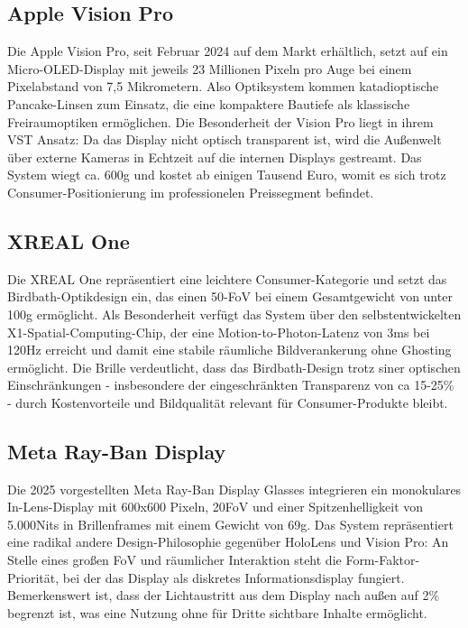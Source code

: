 \subsection{Apple Vision Pro}
\label{subsec:AppleVision}
Die Apple Vision Pro, seit Februar 2024 auf dem Markt erhältlich, setzt auf ein Micro-OLED-Display mit jeweils 23 Millionen Pixeln pro Auge bei einem Pixelabstand von 7,5 Mikrometern. Also Optiksystem kommen katadioptische Pancake-Linsen zum Einsatz, die eine kompaktere Bautiefe als klassische Freiraumoptiken ermöglichen. Die Besonderheit der Vision Pro liegt in ihrem \ac{VST} Ansatz: Da das Display nicht optisch transparent ist, wird die Außenwelt über externe Kameras in Echtzeit auf die internen Displays gestreamt. Das System wiegt ca. 600g und kostet ab einigen Tausend Euro, womit es sich trotz Consumer-Positionierung im professionelen Preissegment befindet. \autocite[vgl. ]{AppleVisionPro}

\subsection{XREAL One}
\label{subsec:Xreal}
Die XREAL One repräsentiert eine leichtere Consumer-Kategorie und setzt das Birdbath-Optikdesign ein, das einen 50\textdegree-\ac{FoV} bei einem Gesamtgewicht von unter 100g ermöglicht. Als Besonderheit verfügt das System über den selbstentwickelten X1-Spatial-Computing-Chip, der eine Motion-to-Photon-Latenz von 3ms bei 120Hz erreicht und damit eine stabile räumliche Bildverankerung ohne Ghosting ermöglicht. Die Brille verdeutlicht, dass das Birdbath-Design trotz siner optischen Einschränkungen - insbesondere der eingeschränkten Transparenz von ca 15-25\% - durch Kostenvorteile und Bildqualität relevant für Consumer-Produkte bleibt. \autocite[vgl. ]{XREALBuildingAugmented}

\subsection{Meta Ray-Ban Display}
\label{subsec:Ray-Ban}
Die 2025 vorgestellten Meta Ray-Ban Display Glasses integrieren ein monokulares In-Lens-Display mit 600x600 Pixeln, 20\textdegree \ac{FoV} und einer Spitzenhelligkeit von 5.000Nits in Brillenframes mit einem Gewicht von 69g. Das System repräsentiert eine radikal andere Design-Philosophie gegenüber HoloLens und Vision Pro: An Stelle eines großen \ac{FoV} und räumlicher Interaktion steht die Form-Faktor-Priorität, bei der das Display als diskretes Informationsdisplay fungiert. Bemerkenswert ist, dass der Lichtaustritt aus dem Display nach außen auf 2\% begrenzt ist, was eine Nutzung ohne für Dritte sichtbare Inhalte ermöglicht.\autocite[vgl. ]{NeueKIgestuetzteMeta}

